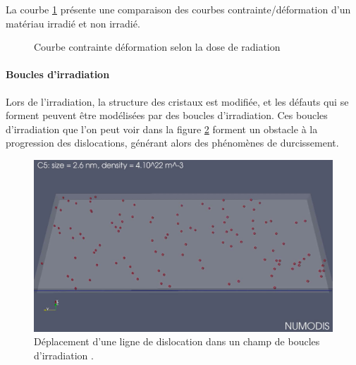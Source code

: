 \documentclass[11pt,class=article,float=false,crop=false]{standalone}
\begin{document}
La courbe \ref{fig:irradiation-stress-strain} présente une comparaison des courbes contrainte/déformation d'un matériau irradié et non irradié.

\begin{figure}[H]
	\centering
	\caption[Courbe contrainte déformation du fer selon la dose de radiation]{Courbe contrainte déformation selon la dose de radiation}
	\label{fig:irradiation-stress-strain}
\end{figure}



\paragraph{Boucles d'irradiation}

Lors de l'irradiation, la structure des cristaux est modifiée, et les défauts qui se forment peuvent être modélisées par des boucles d'irradiation. Ces boucles d'irradiation que l'on peut voir dans la figure \ref{fig:boucles_irradiation} forment un obstacle à la progression des dislocations, générant alors des phénomènes de durcissement.

\begin{figure}[H]
	\centering
	\includegraphics[height=0.3\textheight]{img/boucles-irradiation}
	\caption[Déplacement d'une ligne de dislocation dans un champ de boucles d'irradiation]{Déplacement d'une ligne de dislocation dans un champ de boucles d'irradiation .}
	\label{fig:boucles_irradiation}
\end{figure}

\paragraph{}
\end{document}
